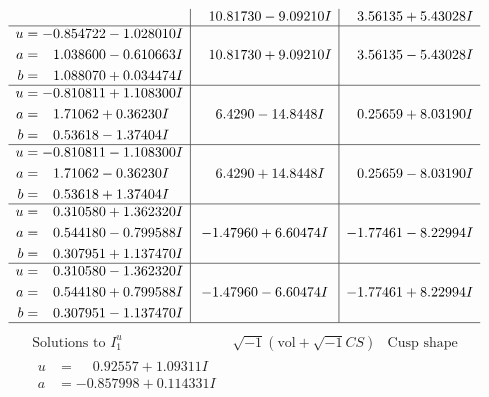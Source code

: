 \documentclass[1p]{elsarticle_modified}
\theoremstyle{definition}
\newcommand{\I}{\sqrt{-1}}
\begin{document}
$$\begin{array}{c|c|c}
 & \phantom{-}10.81730 - 9.09210 I & \phantom{-}3.56135 + 5.43028 I \\ \hline\begin{aligned}
u &= -0.854722 - 1.028010 I \\
a &= \phantom{-}1.038600 - 0.610663 I \\
b &= \phantom{-}1.088070 + 0.034474 I\end{aligned}
 & \phantom{-}10.81730 + 9.09210 I & \phantom{-}3.56135 - 5.43028 I \\ \hline\begin{aligned}
u &= -0.810811 + 1.108300 I \\
a &= \phantom{-}1.71062 + 0.36230 I \\
b &= \phantom{-}0.53618 - 1.37404 I\end{aligned}
 & \phantom{-}6.4290 - 14.8448 I & \phantom{-}0.25659 + 8.03190 I \\ \hline\begin{aligned}
u &= -0.810811 - 1.108300 I \\
a &= \phantom{-}1.71062 - 0.36230 I \\
b &= \phantom{-}0.53618 + 1.37404 I\end{aligned}
 & \phantom{-}6.4290 + 14.8448 I & \phantom{-}0.25659 - 8.03190 I \\ \hline\begin{aligned}
u &= \phantom{-}0.310580 + 1.362320 I \\
a &= \phantom{-}0.544180 - 0.799588 I \\
b &= \phantom{-}0.307951 + 1.137470 I\end{aligned}
 & -1.47960 + 6.60474 I & -1.77461 - 8.22994 I \\ \hline\begin{aligned}
u &= \phantom{-}0.310580 - 1.362320 I \\
a &= \phantom{-}0.544180 + 0.799588 I \\
b &= \phantom{-}0.307951 - 1.137470 I\end{aligned}
 & -1.47960 - 6.60474 I & -1.77461 + 8.22994 I\\
 \hline 
 \end{array}$$\newpage$$\begin{array}{c|c|c}  
\text{Solutions to }I^u_{1}& \I (\text{vol} + \sqrt{-1}CS) & \text{Cusp shape}\\
 \hline 
\begin{aligned}
u &= \phantom{-}0.92557 + 1.09311 I \\
a &= -0.857998 + 0.114331 I \\

\end{aligned}
\end{array}$$
\end{document}
